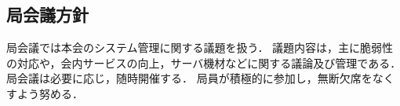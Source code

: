 \subsection*{局会議方針}


局会議では本会のシステム管理に関する議題を扱う．
議題内容は，主に脆弱性の対応や，会内サービスの向上，サーバ機材などに関する議論及び管理である．
局会議は必要に応じ，随時開催する．
局員が積極的に参加し，無断欠席をなくすよう努める．
